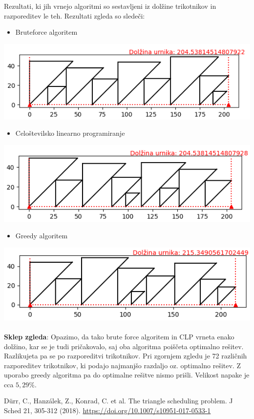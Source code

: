 \documentclass[a4paper,12pt]{article}
\theoremstyle{definition}
\theoremstyle{plain}
\begin{document}
Rezultati, ki jih vrnejo algoritmi so sestavljeni iz dolžine trikotnikov in razporeditev le teh. Rezultati
zgleda so sledeči:
\begin{itemize}
    \item Bruteforce algoritem
\end{itemize}    
    \includegraphics[]{sim_brut.png}
    \begin{itemize}
    \item Celoštevilsko linearno programiranje
\end{itemize}    
    \includegraphics[]{sim_clp.png}
    \begin{itemize}
    \item Greedy algoritem
\end{itemize}    
    \includegraphics[]{sim_greedy.png}
\\ \\
\textbf{Sklep zgleda}: Opazimo, da tako brute force algoritem in CLP vrneta enako dolžino,
kar se je tudi pričakovalo, saj oba algoritma poiščeta optimalno rešitev. Razlikujeta pa se po
razporeditvi trikotnikov. Pri zgornjem zgledu je 72 različnih razporeditev trikotnikov, ki podajo najmanjšo
razdaljo oz. optimalno rešitev. Z uporabo greedy algoritma pa do optimalne rešitve nismo
prišli. Velikost napake je cca $5,29\%$.


\begin{thebibliography}{9}
          Dürr, C., Hanzálek, Z., Konrad, C. et al. The triangle scheduling problem. J Sched 21, 305-312 (2018). \href{https://doi.org/10.1007/s10951-017-0533-1}{https://doi.org/10.1007/s10951-017-0533-1 }
\end{thebibliography}
\end{document}

